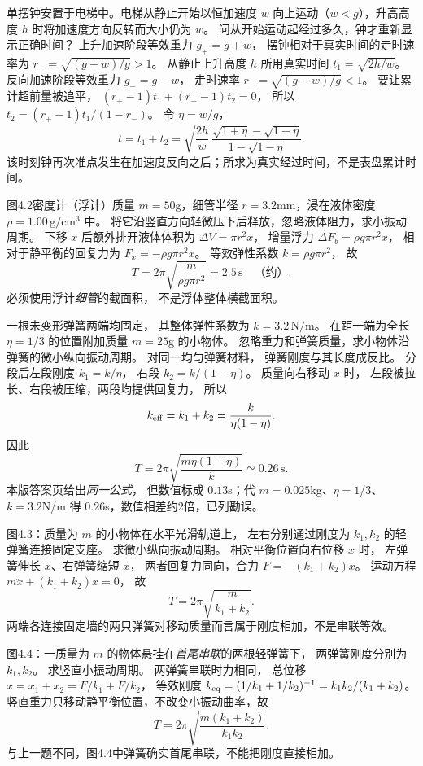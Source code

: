 单摆钟安置于电梯中。电梯从静止开始以恒加速度
$w$ 向上运动（$w<g$），升高高度 $h$ 时将加速度方向反转而大小仍为 $w$。
问从开始运动起经过多久，钟才重新显示正确时间？
\exsolution
上升加速阶段等效重力
$g_+=g+w$，
摆钟相对于真实时间的走时速率为
$r_+=\sqrt{(g+w)/g}>1$。
从静止上升高度 $h$ 所用真实时间
$t_1=\sqrt{2h/w}$。
反向加速阶段等效重力
$g_-=g-w$，
走时速率
$r_-=\sqrt{(g-w)/g}<1$。
要让累计超前量被追平，
$(r_+-1)t_1+(r_--1)t_2=0$，
所以
$t_2=(r_+-1)t_1/(1-r_-)$。
令 $\eta=w/g$，
\[
\boxed{t=t_1+t_2=
\sqrt{\frac{2h}{w}}\,
\frac{\sqrt{1+\eta}-\sqrt{1-\eta}}
{1-\sqrt{1-\eta}}}.
\]
\excheck 该时刻钟再次准点发生在加速度反向之后；所求为真实经过时间，不是表盘累计时间。

图4.2密度计（浮计）质量
$m=50$g，细管半径
$r=3.2$mm，浸在液体密度
$\rho=1.00\,\mathrm{g/cm^3}$ 中。
将它沿竖直方向轻微压下后释放，忽略液体阻力，求小振动周期。
\exsolution
下移 $x$ 后额外排开液体体积为
$\Delta V=\pi r^2x$，
增量浮力
$\Delta F_b=\rho g\pi r^2x$，
相对于静平衡的回复力为
$F_x=-\rho g\pi r^2x$。
等效弹性系数
$k=\rho g\pi r^2$，
故
\[
\boxed{T=2\pi\sqrt{\frac{m}{\rho g\pi r^2}}}
=\boxed{2.5\,\mathrm s}\quad\text{（约）}.
\]
\excheck 必须使用浮计\emph{细管}的截面积，
不是浮体整体横截面积。

一根未变形弹簧两端均固定，
其整体弹性系数为
$k=3.2\,\mathrm{N/m}$。
在距一端为全长
$\eta=1/3$ 的位置附加质量
$m=25$g 的小物体。
忽略重力和弹簧质量，求小物体沿弹簧的微小纵向振动周期。
\exsolution
对同一均匀弹簧材料，
弹簧刚度与其长度成反比。
分段后左段刚度
$k_1=k/\eta$，
右段
$k_2=k/(1-\eta)$。
质量向右移动 $x$ 时，
左段被拉长、右段被压缩，两段均提供回复力，
所以
\[
k_{\rm eff}=k_1+k_2
=\frac{k}{\eta(1-\eta)}.
\]
因此
\[
\boxed{T=2\pi\sqrt{\frac{m\eta(1-\eta)}{k}}
\simeq0.26\,\mathrm s}.
\]
\excheck 本版答案页给出\emph{同一公式}，
但数值标成 $0.13$s；代
$m=0.025$kg、$\eta=1/3$、$k=3.2$N/m
得 $0.26$s，数值相差约2倍，已列勘误。

图4.3：质量为 $m$ 的小物体在水平光滑轨道上，
左右分别通过刚度为 $k_1,k_2$ 的轻弹簧连接固定支座。
求微小纵向振动周期。
\exsolution
相对平衡位置向右位移 $x$ 时，
左弹簧伸长 $x$、右弹簧缩短 $x$，
两者回复力同向，合力
$F=-(k_1+k_2)x$。
运动方程
$m\ddot x+(k_1+k_2)x=0$，
故
\[
\boxed{T=2\pi\sqrt{\frac{m}{k_1+k_2}}}.
\]
\excheck 两端各连接固定墙的两只弹簧对移动质量而言属于刚度相加，不是串联等效。

图4.4：一质量为 $m$ 的物体悬挂在\emph{首尾串联}的两根轻弹簧下，
两弹簧刚度分别为 $k_1,k_2$。
求竖直小振动周期。
\exsolution
两弹簧串联时力相同，
总位移 $x=x_1+x_2=F/k_1+F/k_2$，
等效刚度
$k_{\rm eq}=(1/k_1+1/k_2)^{-1}
=k_1k_2/(k_1+k_2)$。
竖直重力只移动静平衡位置，不改变小振动曲率，故
\[
\boxed{T=2\pi\sqrt{\frac{m(k_1+k_2)}{k_1k_2}}}.
\]
\excheck 与上一题不同，图4.4中弹簧确实首尾串联，不能把刚度直接相加。

